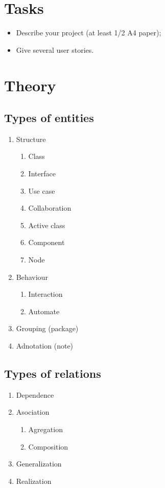 \documentclass[12pt,a4paper,titlepage]{article}
\begin{document}
\section{Tasks}
\begin{itemize}
	\item
	Describe your project (at least 1/2 A4 paper);
	\item 
	Give several user stories.
\end{itemize}

\section{Theory}
\subsection{Types of entities}
\begin{enumerate}  
	\item Structure
	\begin{enumerate}  
		\item Class
		\item Interface
		\item Use case
		\item Collaboration
		\item Active class
		\item Component
		\item Node 
	\end{enumerate}
	\item Behaviour
	\begin{enumerate}  
		\item Interaction
		\item Automate
	\end{enumerate}
	\item Grouping (package)
	\item Adnotation (note)
\end{enumerate}

\subsection{Types of relations}
\begin{enumerate}  
	\item Dependence
	\item Asociation
	\begin{enumerate}  
		\item Agregation
		\item Composition
	\end{enumerate}
	\item Generalization
	\item Realization 
\end{enumerate}
\end{document}
